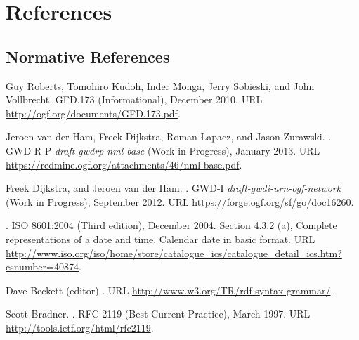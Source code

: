 %
\section*{References}%
\label{s:references}
% 
\renewcommand{\refname}{}

\subsection*{Normative References}
\begin{thebibliography}{10}
\vspace*{-3em}
Guy Roberts, Tomohiro Kudoh, Inder Monga, Jerry Sobieski, and John Vollbrecht.
\newblock GFD.173 (Informational), December 2010.
\newblock URL \url{http://ogf.org/documents/GFD.173.pdf}.

Jeroen van der Ham, Freek Dijkstra, Roman Łapacz, and Jason Zurawski.
.
\newblock GWD-R-P \emph{draft-gwdrp-nml-base} (Work in Progress), January 2013.
\newblock URL \url{https://redmine.ogf.org/attachments/46/nml-base.pdf}.

Freek Dijkstra, and Jeroen van der Ham.
.
\newblock GWD-I \emph{draft-gwdi-urn-ogf-network} (Work in Progress), September 2012.
\newblock URL \url{https://forge.ogf.org/sf/go/doc16260}.

.
\newblock ISO 8601:2004 (Third edition), December 2004.
\newblock Section 4.3.2 (a), Complete representations of a date and time. Calendar date in basic format.
\newblock URL \url{http://www.iso.org/iso/home/store/catalogue_ics/catalogue_detail_ics.htm?csnumber=40874}.

Dave Beckett (editor)
.
\newblock URL \url{http://www.w3.org/TR/rdf-syntax-grammar/}.

Scott Bradner.
.
\newblock RFC 2119 (Best Current Practice), March 1997.
\newblock URL \url{http://tools.ietf.org/html/rfc2119}.


\end{thebibliography}
